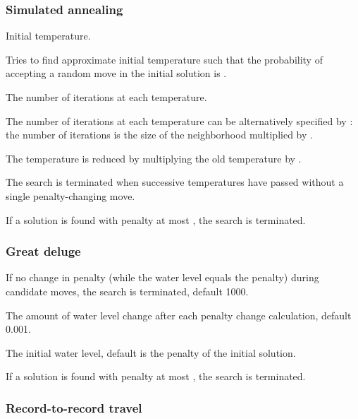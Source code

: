 \documentclass[12pt,a4paper]{article}
\begin{document}
\subsubsection{Simulated annealing}
\label{sec:sa}

\begin{owndescription}
\item[\Var{IT}] Initial temperature.
\item[\Var{IP}] Tries to find approximate initial temperature such
  that the probability of accepting a random move in the initial
  solution is .
\item[\Var{L}] The number of iterations at each temperature.
\item[\Var{LF}] The number of iterations at each temperature can be
  alternatively specified by : the number of iterations is the
  size of the neighborhood multiplied by .
\item[\Var{CF}] The temperature is reduced by multiplying the old
  temperature by .
\item[\Var{frozen}] The search is terminated when 
  successive temperatures have passed without a single
  penalty-changing move.
\item[\Var{endlimit}] If a solution is found with penalty at most
  , the search is terminated.
\end{owndescription}

\subsubsection{Great deluge}
\label{sec:deluge}

\begin{owndescription}
\item[\Var{frozen}] If no change in penalty (while the water level
  equals the penalty) during  candidate moves, the search
  is terminated, default 1000.
\item[\Var{down}] The amount of water level change after each penalty
  change calculation, default 0.001.
\item[\Var{initlevel}] The initial water level, default is the penalty
  of the initial solution.
\item[\Var{endlimit}] If a solution is found with penalty at most
  , the search is terminated.
\end{owndescription}

\subsubsection{Record-to-record travel}
\label{sec:record}
\end{document}
